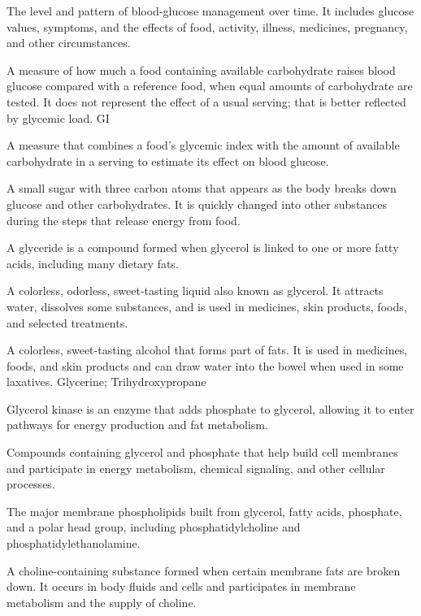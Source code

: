  The level and pattern of blood-glucose management over time. It includes glucose values, symptoms, and the effects of food, activity, illness, medicines, pregnancy, and other circumstances.

 A measure of how much a food containing available carbohydrate raises blood glucose compared with a reference food, when equal amounts of carbohydrate are tested. It does not represent the effect of a usual serving; that is better reflected by glycemic load.
\synonyms
GI

 A measure that combines a food’s glycemic index with the amount of available carbohydrate in a serving to estimate its effect on blood glucose.

 A small sugar with three carbon atoms that appears as the body breaks down glucose and other carbohydrates. It is quickly changed into other substances during the steps that release energy from food.

 A glyceride is a compound formed when glycerol is linked to one or more fatty acids, including many dietary fats.

 A colorless, odorless, sweet-tasting liquid also known as glycerol. It attracts water, dissolves some substances, and is used in medicines, skin products, foods, and selected treatments.

 A colorless, sweet-tasting alcohol that forms part of fats. It is used in medicines, foods, and skin products and can draw water into the bowel when used in some laxatives.
\synonyms
Glycerine; Trihydroxypropane

 Glycerol kinase is an enzyme that adds phosphate to glycerol, allowing it to enter pathways for energy production and fat metabolism.

 Compounds containing glycerol and phosphate that help build cell membranes and participate in energy metabolism, chemical signaling, and other cellular processes.

 The major membrane phospholipids built from glycerol, fatty acids, phosphate, and a polar head group, including phosphatidylcholine and phosphatidylethanolamine.

 A choline-containing substance formed when certain membrane fats are broken down. It occurs in body fluids and cells and participates in membrane metabolism and the supply of choline.

